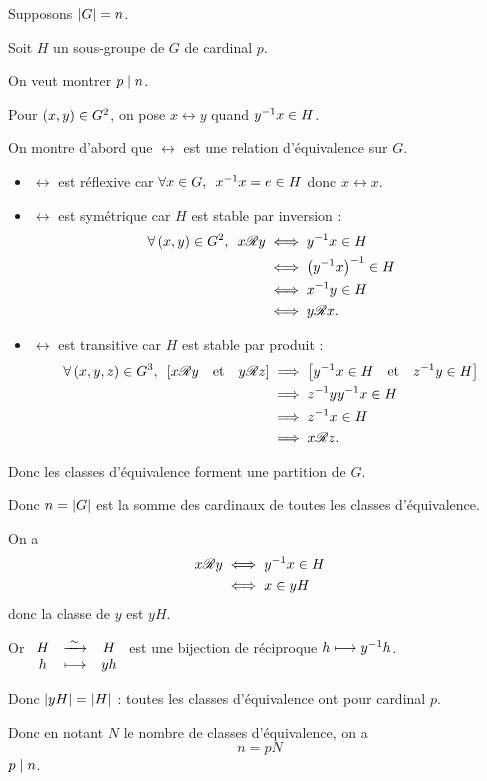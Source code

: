 \begin{dem}
Supposons \(\left\lvert G\right\rvert=n\).

Soit \(H\) un sous-groupe de \(G\) de cardinal \(p\).

On veut montrer \(p\mid n\).

Pour \(\left(x,y\right)\in G^2\), on pose \(x\rel y\) quand \(y^{-1} x\in H\).

On montre d'abord que \(\rel\) est une relation d'équivalence sur \(G\).

\begin{itemize}
    \item \(\rel\) est réflexive car \(\quantifs{\forall x\in G}x\inv x=e\in H\) donc \(x\rel x\). \\
    \item \(\rel\) est symétrique car \(H\) est stable par inversion : \[\begin{aligned}
        \quantifs{\forall\paren{x,y}\in G^2}x\rel y&\ssi y\inv x\in H \\
        &\ssi\paren{y\inv x}\inv\in H \\
        &\ssi x\inv y\in H \\
        &\ssi y\rel x.
    \end{aligned}\]
    \item \(\rel\) est transitive car \(H\) est stable par produit : \[\begin{aligned}
        \quantifs{\forall\paren{x,y,z}\in G^3}\croch{x\rel y\quad\text{et}\quad y\rel z}&\imp\croch{y\inv x\in H\quad\text{et}\quad z\inv y\in H} \\
        &\imp z\inv yy\inv x\in H \\
        &\imp z\inv x\in H \\
        &\imp x\rel z.
    \end{aligned}\]
\end{itemize}

Donc les classes d'équivalence forment une partition de \(G\).

Donc \(n=\left\lvert G\right\rvert\) est la somme des cardinaux de toutes les classes d'équivalence.

On a \[\begin{aligned}
x\mathscr{R} y&\iff y^{-1} x\in H \\
&\iff x\in yH
\end{aligned}\] donc la classe de \(y\) est \(yH\).

Or \(\begin{array}[t]{ccc}H & \xrightarrow{\;\sim\;} & H \\ h & \longmapsto & yh\end{array}\) est une bijection de réciproque \(h\longmapsto y^{-1} h\).

Donc \(\left\lvert yH\right\rvert=\left\lvert H\right\rvert\) : toutes les classes d'équivalence ont pour cardinal \(p\).

Donc en notant \(N\) le nombre de classes d'équivalence, on a \[n=pN\] \ie \(p\mid n\).
\end{dem}

